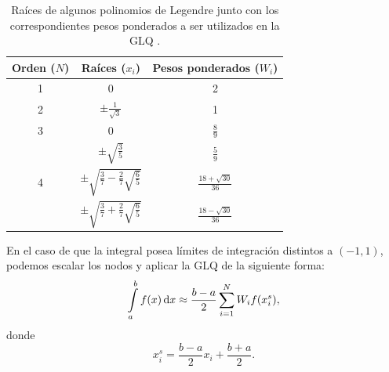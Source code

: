 \begin{table}
    \centering
    \caption{
        Raíces de algunos polinomios de Legendre junto con los correspondientes
        pesos ponderados a ser utilizados en la \ac{GLQ}
        \citep[][p.~392]{hildebrand1987}.
    }
    \begin{tabular}{ccc}
        \hline
        Orden ($N$) & Raíces ($x_i$)                                     & Pesos ponderados ($W_i$)    \\
        \hline
        1     & 0                                                        & 2                           \\
        2     & $\pm \frac{1}{\sqrt{3}}$                                 & 1                           \\
        3     & 0                                                        & $\frac{8}{9}$               \\
              & $\pm \sqrt{\frac{3}{5}}$                                 & $\frac{5}{9}$               \\
        4     & $\pm \sqrt{\frac{3}{7} - \frac{2}{7}\sqrt{\frac{6}{5}}}$ & $\frac{18 + \sqrt{30}}{36}$ \\
              & $\pm \sqrt{\frac{3}{7} + \frac{2}{7}\sqrt{\frac{6}{5}}}$ & $\frac{18 - \sqrt{30}}{36}$
    \end{tabular}
    \label{tab:legendre-roots}
\end{table}

En el caso de que la integral posea límites de integración distintos a
$(-1, 1)$, podemos escalar los nodos y aplicar la \ac{GLQ} de la siguiente
forma:
%
\begin{equation}
    \int\limits_a^b f(x) \mathop{}\!\textnormal{d} x \approx
        \frac{b - a}{2} \sum\limits_{i=1}^{N}
        W_i f(x_i^s),
\end{equation}
%
donde
%
\begin{equation}
    x_i^s = \frac{b - a}{2} x_i + \frac{b + a}{2}.
\end{equation}


